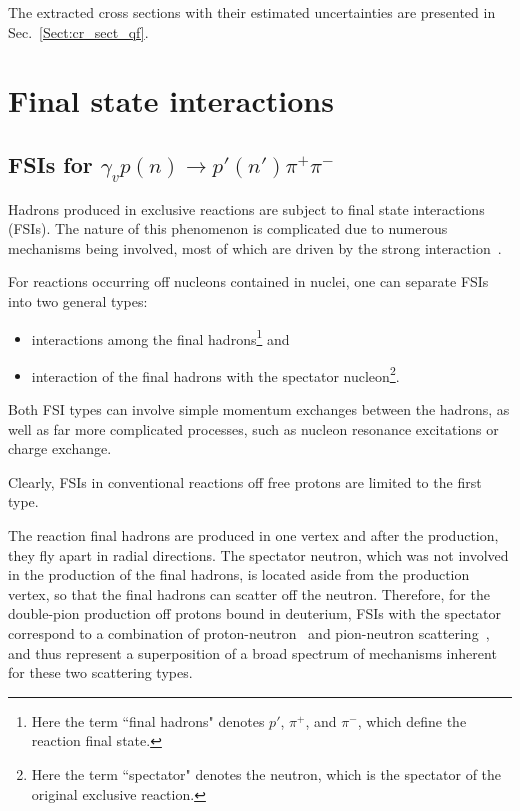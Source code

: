 \documentclass[prc,twocolumn,superscriptaddress,showpacs,amssymb,amsmath,amsfonts,aps,nofootinbib]{revtex4-1}
\begin{document}
The extracted cross sections with their estimated uncertainties are presented in Sec.\!~\ref{Sect:cr_sect_qf}.


\section{Final state interactions}
\label{Sect:discuss_fsi}

\subsection{FSIs for $\gamma_{v}p(n) \rightarrow p' (n')\pi^{+}\pi^{-}$}
\label{Sect:intro_fsi}

Hadrons produced in exclusive reactions are subject to final state interactions (FSIs). The nature of this phenomenon is complicated due to numerous mechanisms being involved, most of which are driven by the strong interaction~\cite{Darwish:2002qu,PhysRevC.84.035203}. 

For reactions occurring off nucleons contained in nuclei, one can separate FSIs into two general types:

\begin{itemize}
\item interactions among the final hadrons\footnote[3]{Here the term ``final hadrons" denotes $p'$, $\pi^{+}$, and $\pi^{-}$, which define the reaction final state.} and
\item interaction of the final hadrons with the spectator nucleon\footnote[4]{Here the term ``spectator" denotes the neutron, which is the spectator of the original exclusive reaction.}.
\end{itemize}

Both FSI types can involve simple momentum exchanges between the hadrons, as well as far more complicated processes, such as nucleon resonance excitations or charge exchange.

Clearly, FSIs in conventional reactions off free protons are limited to the first type.


The reaction final hadrons are produced in one vertex and after the production, they fly apart in radial directions.  The spectator neutron, which was not involved in the production of the final hadrons, is located aside from the production vertex, so that the final hadrons can scatter off the neutron. Therefore, for the double-pion production off protons bound in deuterium, FSIs with the spectator correspond to a combination of proton-neutron~\cite{Shirokov_Yudin:1980,PhysRev.75.705} and pion-neutron scattering~\cite{PhysRevD.20.2804,Gasparyan:2003fp,Vrana:1999nt}, and thus represent a superposition of a broad spectrum of mechanisms inherent for these two scattering types. 
\end{document}
